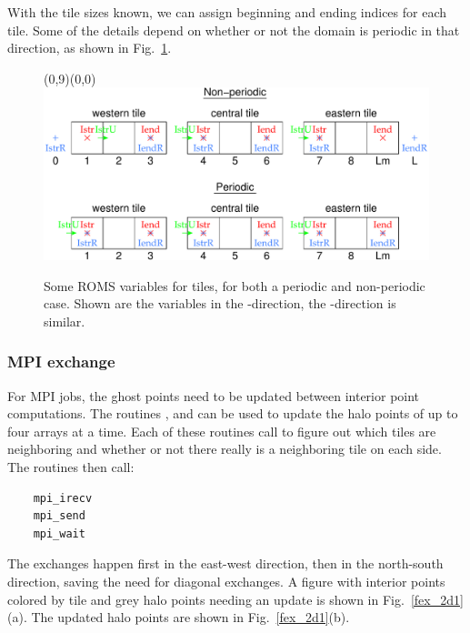 With the tile sizes known, we can assign beginning and ending
indices for each tile. Some of the details depend on whether or
not the domain is periodic in that direction, as shown in Fig.\
\ref{ftile3}.

\begin{figure}[tb]
\setlength{\unitlength}{10mm}
\begin{picture}(0,9)(0,0)
\includegraphics[width=165mm]{pics/Istr}
  \end{picture}
  \caption{Some ROMS variables for tiles, for both a periodic and
  non-periodic case. Shown are the variables in the
  -direction, the -direction is similar.}
  \label{ftile3}
\end{figure}

\subsubsection{MPI exchange}

For MPI jobs, the ghost points need to be updated between
interior point computations. The routines
,  and
 can be used to update the halo points of
up to four arrays at a time. Each of these routines call
 to figure out which tiles are neighboring and
whether or not there really is a neighboring tile on each side. The
\code{mp\_exchangexd} routines then call:
\begin{verbatim}
    mpi_irecv
    mpi_send
    mpi_wait
\end{verbatim}
The exchanges happen first in the east-west direction, then in the
north-south direction, saving the need for diagonal exchanges. A figure
with interior points colored by tile and grey halo points needing an
update is shown in Fig.\ \ref{fex_2d1}(a). The updated halo points are
shown in Fig.\ \ref{fex_2d1}(b).

